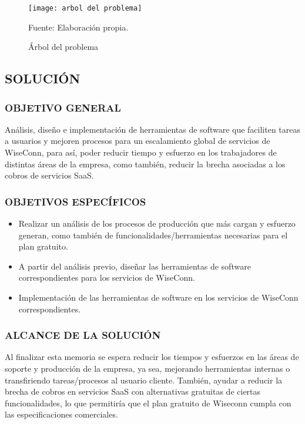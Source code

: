 \begin{figure}
    \centering
	\texttt{[image: arbol del problema]}
	\caption{\label{fig:arbolproblema} Árbol del problema} Fuente: Elaboración propia.
\end{figure}

\subsection{SOLUCIÓN}

\subsubsection{OBJETIVO GENERAL}

Análisis, diseño e implementación de herramientas de software que faciliten tareas a usuarios y mejoren procesos para un escalamiento global de servicios de WiseConn, para así, poder reducir tiempo y esfuerzo en los trabajadores de distintas áreas de la empresa, como también, reducir la brecha asociadas a los cobros de servicios SaaS.

\subsubsection{OBJETIVOS ESPECÍFICOS}
\begin{itemize}
    \item Realizar un análisis de los procesos de producción que más cargan y esfuerzo generan, como también de funcionalidades/herramientas necesarias para el plan gratuito.
    \item A partir del análisis previo, diseñar las herramientas de software correspondientes para los servicios de WiseConn.
    \item Implementación de las herramientas de software en los servicios de WiseConn correspondientes.
\end{itemize}

\subsubsection{ALCANCE DE LA SOLUCIÓN}
Al finalizar esta memoria se espera reducir los tiempos y esfuerzos en las áreas de soporte y producción de la empresa, ya sea, mejorando herramientas internas o transfiriendo tareas/procesos al usuario cliente. También, ayudar a reducir la brecha de cobros en servicios SaaS con alternativas gratuitas de ciertas funcionalidades, lo que permitiría que el plan gratuito de Wiseconn cumpla con las especificaciones comerciales.
